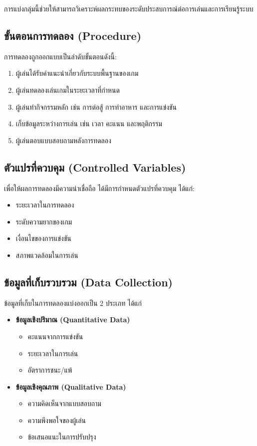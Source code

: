 การแบ่งกลุ่มนี้ช่วยให้สามารถวิเคราะห์ผลกระทบของระดับประสบการณ์ต่อการเล่นและการเรียนรู้ระบบ

\subsection{ขั้นตอนการทดลอง (Procedure)}

การทดลองถูกออกแบบเป็นลำดับขั้นตอนดังนี้:

\begin{enumerate}
\item ผู้เล่นได้รับคำแนะนำเกี่ยวกับระบบพื้นฐานของเกม
\item ผู้เล่นทดลองเล่นเกมในระยะเวลาที่กำหนด
\item ผู้เล่นทำกิจกรรมหลัก เช่น การต่อสู้ การทำอาหาร และการแข่งขัน
\item เก็บข้อมูลระหว่างการเล่น เช่น เวลา คะแนน และพฤติกรรม
\item ผู้เล่นตอบแบบสอบถามหลังการทดลอง
\end{enumerate}

\subsection{ตัวแปรที่ควบคุม (Controlled Variables)}

เพื่อให้ผลการทดลองมีความน่าเชื่อถือ ได้มีการกำหนดตัวแปรที่ควบคุม ได้แก่:

\begin{itemize}
\item ระยะเวลาในการทดลอง
\item ระดับความยากของเกม
\item เงื่อนไขของการแข่งขัน
\item สภาพแวดล้อมในการเล่น
\end{itemize}

\subsection{ข้อมูลที่เก็บรวบรวม (Data Collection)}

ข้อมูลที่เก็บในการทดลองแบ่งออกเป็น 2 ประเภท ได้แก่

\begin{itemize}
\item \textbf{ข้อมูลเชิงปริมาณ (Quantitative Data)}
\begin{itemize}
\item คะแนนจากการแข่งขัน
\item ระยะเวลาในการเล่น
\item อัตราการชนะ/แพ้
\end{itemize}

\item \textbf{ข้อมูลเชิงคุณภาพ (Qualitative Data)}
\begin{itemize}
\item ความคิดเห็นจากแบบสอบถาม
\item ความพึงพอใจของผู้เล่น
\item ข้อเสนอแนะในการปรับปรุง
\end{itemize}
\end{itemize}

